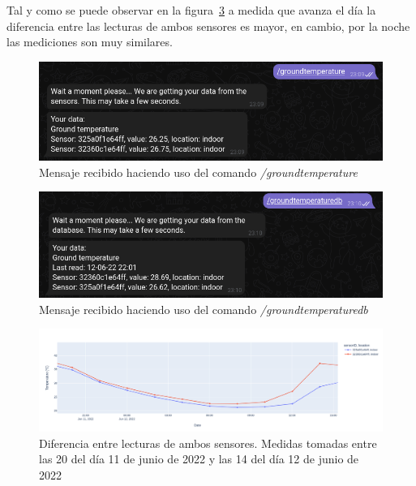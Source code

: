 \documentclass[a4paper, 12pt, oneside]{book}
\begin{document}
Tal y como se puede observar en la figura~\ref{figura:ground_temperature_diferencias} a medida que avanza el día la diferencia entre las lecturas de ambos sensores es mayor, en cambio, por la noche las mediciones son muy similares.

\begin{figure}[H]
	\centering
    \includegraphics[width=12cm, keepaspectratio]{img/ground_temperature_telegram}
    \caption{Mensaje recibido haciendo uso del comando \textit{/groundtemperature}}
    \label{figura:ground_temperature_telegram}
\end{figure}
\begin{figure}[H]
	\centering
    \includegraphics[width=12cm, keepaspectratio]{img/ground_temperature_db_telegram}
    \caption{Mensaje recibido haciendo uso del comando \textit{/groundtemperaturedb}}
    \label{figura:ground_temperature_db_telegram}
\end{figure}

\begin{figure}[H]
	\centering
    \includegraphics[width=12cm, keepaspectratio]{img/ground_temperature_diferencias}
    \caption{Diferencia entre lecturas de ambos sensores. Medidas tomadas entre las 20 del día 11 de junio de 2022 y las 14 del día 12 de junio de 2022}
    \label{figura:ground_temperature_diferencias}
\end{figure}
\end{document}

